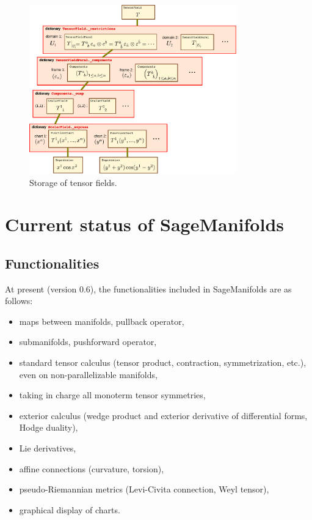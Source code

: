 \documentclass[a4paper]{jpconf}
\newcommand{\soft}[1]{\textsf{#1}}
\newcommand{\SM}{\soft{SageManifolds}}
\begin{document}
\begin{figure}
\begin{center}
\includegraphics[width=0.8\textwidth]{tensorfield_structure.pdf}
\end{center}
\caption{\label{f:tensorfield_structure} Storage of tensor fields.}
\end{figure}




\section{Current status of SageManifolds}

\subsection{Functionalities} \label{s:functionalities}
At present (version 0.6), the functionalities included in \SM{} are as
follows:  
\begin{itemize}
\item maps between manifolds, pullback operator,
\item submanifolds, pushforward operator,
\item standard tensor calculus (tensor product, 
contraction, symmetrization, etc.), even on non-parallelizable manifolds,
\item taking in charge all monoterm tensor symmetries, 
\item exterior calculus (wedge product and exterior derivative of differential forms,
Hodge duality),
\item Lie derivatives,
\item affine connections (curvature, torsion),
\item pseudo-Riemannian metrics (Levi-Civita connection, Weyl tensor),
\item graphical display of charts.
\end{itemize}
\end{document}
